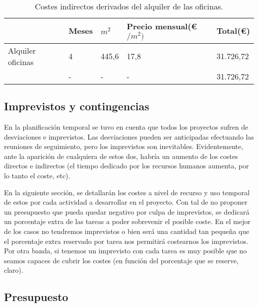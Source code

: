 \begin{table}[ht!]
\begin{tabular}{l|l|l|l|l|}
\cline{2-5}
                                                    & Meses   & $m^{2}$ & Precio mensual(\euro$/m^{2})$ & Total(\euro) \\ \hline
\multicolumn{1}{|l|}{Alquiler oficinas }            & 4  & 445,6   & 17,8 & 31.726,72     \\ \hline
\rowcolor{gray!50}
\multicolumn{1}{|l|}{Total} & - &   -       &  -              &   31.726,72       \\ \hline
\end{tabular}
\caption{Costes indirectos derivados del alquiler de las oficinas.}
\end{table}

\subsection{Imprevistos y contingencias}

En la planificación temporal se tuvo en cuenta que todos los proyectos sufren de desviaciones e imprevistos. Las desviaciones pueden ser anticipadas efectuando las reuniones de seguimiento, pero los imprevistos son inevitables. Evidentemente, ante la aparición de cualquiera de estos dos, habría un aumento de los costes directos e indirectos (el tiempo dedicado por los recursos humanos aumenta, por lo tanto el coste, etc).
\par\medskip
En la siguiente sección, se detallarán los costes a nivel de recurso y uso temporal de estos por cada actividad a desarrollar en el proyecto. Con tal de no proponer un presupuesto que pueda quedar negativo por culpa de imprevistos, se dedicará un porcentaje extra de las tareas a poder sobrevenir el posible coste.
En el mejor de los casos no tendremos imprevistos o bien será una cantidad tan pequeña que el porcentaje extra reservado por tarea nos permitirá costearnos los imprevistos. Por otra banda, si tenemos un imprevisto con cada tarea es muy posible que no seamos capaces de cubrir los costes (en función del porcentaje que se reserve, claro).

\subsection{Presupuesto}


